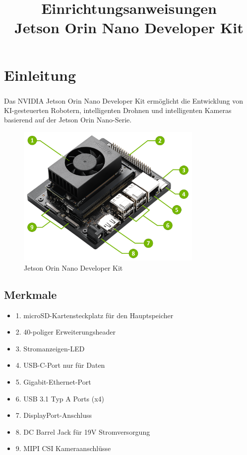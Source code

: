 \documentclass{article}
\title{Einrichtungsanweisungen \\Jetson Orin Nano Developer Kit}
\author{}
\date{}
\begin{document}
\maketitle

\section*{Einleitung}

Das NVIDIA\textsuperscript{\textregistered} Jetson Orin Nano\textsuperscript{\texttrademark} Developer Kit ermöglicht die Entwicklung von KI-gesteuerten Robotern, intelligenten Drohnen und intelligenten Kameras basierend auf der Jetson Orin Nano-Serie.

\begin{figure}[h!]
    \centering

    \includegraphics[width=0.8\textwidth]{jetsonOrinNano8GB.png} 

    \caption{Jetson Orin Nano Developer Kit}
\end{figure}

\subsection*{Merkmale}

\begin{itemize}
    \item 1. microSD-Kartensteckplatz für den Hauptspeicher
    \item 2. 40-poliger Erweiterungsheader
    \item 3. Stromanzeigen-LED
    \item 4. USB-C-Port nur für Daten
    \item 5. Gigabit-Ethernet-Port
    \item 6. USB 3.1 Typ A Ports (x4)
    \item 7. DisplayPort-Anschluss
    \item 8. DC Barrel Jack für 19V Stromversorgung
    \item 9. MIPI CSI Kameraanschlüsse
\end{itemize}
\end{document}

